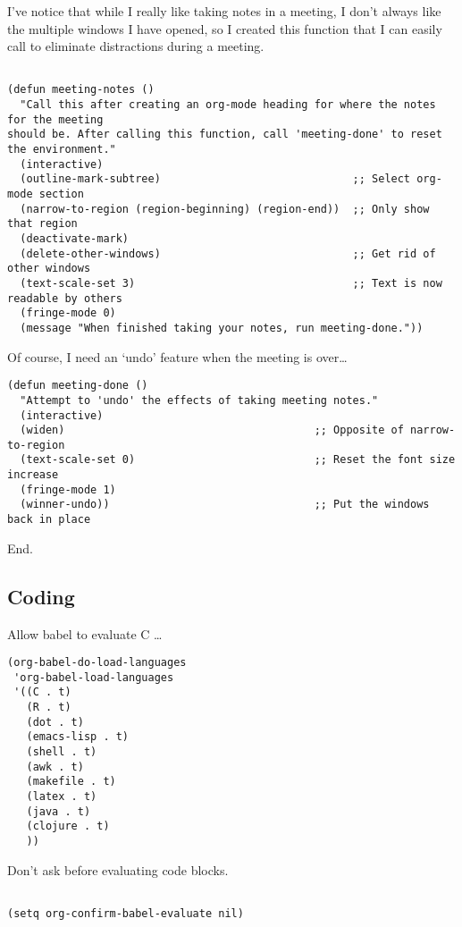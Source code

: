 \documentclass[12pt]{article}
\begin{document}
I’ve notice that while I really like taking notes in a meeting, I don’t always like the multiple windows I have opened, so I created this function that I can easily call to eliminate distractions during a meeting.
\begin{verbatim}

(defun meeting-notes ()
  "Call this after creating an org-mode heading for where the notes for the meeting
should be. After calling this function, call 'meeting-done' to reset the environment."
  (interactive)
  (outline-mark-subtree)                              ;; Select org-mode section
  (narrow-to-region (region-beginning) (region-end))  ;; Only show that region
  (deactivate-mark)
  (delete-other-windows)                              ;; Get rid of other windows
  (text-scale-set 3)                                  ;; Text is now readable by others
  (fringe-mode 0)
  (message "When finished taking your notes, run meeting-done."))

\end{verbatim}
Of course, I need an ‘undo’ feature when the meeting is over…
\begin{verbatim}
(defun meeting-done ()
  "Attempt to 'undo' the effects of taking meeting notes."
  (interactive)
  (widen)                                       ;; Opposite of narrow-to-region
  (text-scale-set 0)                            ;; Reset the font size increase
  (fringe-mode 1)
  (winner-undo))                                ;; Put the windows back in place

\end{verbatim}

End.

\subsection{Coding}
\label{sec:orge589d57}

Allow babel to evaluate C \ldots{}

\begin{verbatim}
(org-babel-do-load-languages
 'org-babel-load-languages
 '((C . t)
   (R . t)
   (dot . t)
   (emacs-lisp . t)
   (shell . t) 
   (awk . t)
   (makefile . t)
   (latex . t)
   (java . t)
   (clojure . t)
   ))

\end{verbatim}

Don’t ask before evaluating code blocks.
\begin{verbatim}

(setq org-confirm-babel-evaluate nil)

\end{verbatim}
\end{document}
